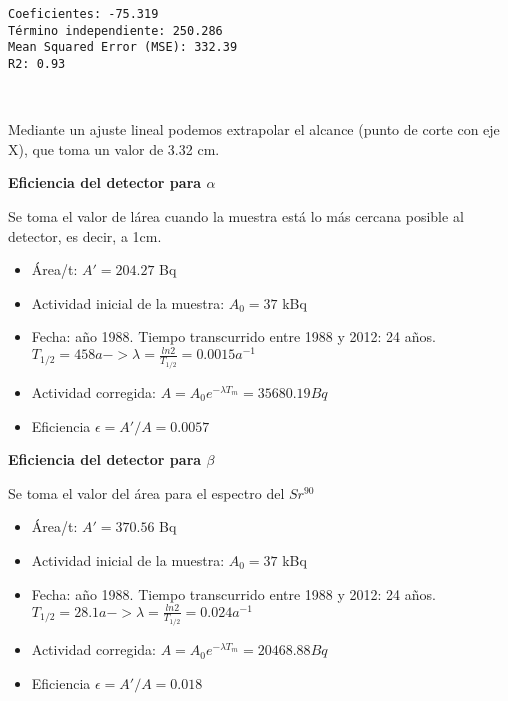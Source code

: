 \documentclass[11pt]{article}
\begin{document}
    \begin{Verbatim}[commandchars=\\\{\}]
Coeficientes: -75.319
Término independiente: 250.286
Mean Squared Error (MSE): 332.39
R2: 0.93
    \end{Verbatim}

    \begin{center}
    \end{center}
    { \hspace*{\fill} \\}
     
            
    
    Mediante un ajuste lineal podemos extrapolar el alcance (punto de corte
con eje X), que toma un valor de 3.32 cm.

    

    \textbf{Eficiencia del detector para \(\alpha\)}

Se toma el valor de lárea cuando la muestra está lo más cercana posible
al detector, es decir, a 1cm.

\begin{itemize}
\item
  Área/t: \(A' = 204.27\) Bq
\item
  Actividad inicial de la muestra: \(A_0 = 37\) kBq
\item
  Fecha: año 1988. Tiempo transcurrido entre 1988 y 2012: 24 años.
  \(T_{1/2} = 458 a -> \lambda = \frac{ln2}{T_{1/2}} = 0.0015 a^{-1}\)
\item
  Actividad corregida: \(A = A_0e^{- \lambda T_m} = 35680.19 Bq\)
\item
  Eficiencia \(\epsilon = A'/A = 0.0057\)
\end{itemize}

    \textbf{Eficiencia del detector para \(\beta\)}

Se toma el valor del área para el espectro del \(Sr^{90}\)

\begin{itemize}
\item
  Área/t: \(A' = 370.56\) Bq
\item
  Actividad inicial de la muestra: \(A_0 = 37\) kBq
\item
  Fecha: año 1988. Tiempo transcurrido entre 1988 y 2012: 24 años.
  \(T_{1/2} = 28.1 a -> \lambda = \frac{ln2}{T_{1/2}} = 0.024 a^{-1}\)
\item
  Actividad corregida: \(A = A_0e^{- \lambda T_m} = 20468.88 Bq\)
\item
  Eficiencia \(\epsilon = A'/A = 0.018\)
\end{itemize}
\end{document}
